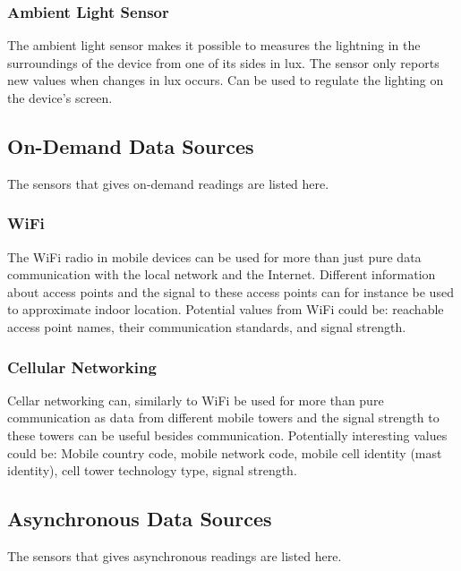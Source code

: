\subsubsection{Ambient Light Sensor}
\label{sub:ambient_light_sensor}
The ambient light sensor makes it possible to measures the lightning in the surroundings of the device from one of its sides in lux. The sensor only reports new values when changes in lux occurs. Can be used to regulate the lighting on the device's screen. 

\subsection{On-Demand Data Sources}
\label{sub:on_demand_sensors}
The sensors that gives on-demand readings are listed here.

\subsubsection{WiFi}
\label{sub:wifi}
The WiFi radio in mobile devices can be used for more than just pure data communication with the local network and the Internet. Different information about access points and the signal to these access points can for instance be used to approximate indoor location.  
Potential values from WiFi could be: reachable access point names, their communication standards, and signal strength.

\subsubsection{Cellular Networking}
\label{sub:cellular_networking}
Cellar networking can, similarly to WiFi be used for more than pure communication as data from different mobile towers and the signal strength to these towers can be useful besides communication. Potentially interesting values could be: Mobile country code, mobile network code, mobile cell identity (mast identity), cell tower technology type, signal strength.

\subsection{Asynchronous Data Sources}
\label{sub:asynchronous_sensors}
The sensors that gives asynchronous readings are listed here.

